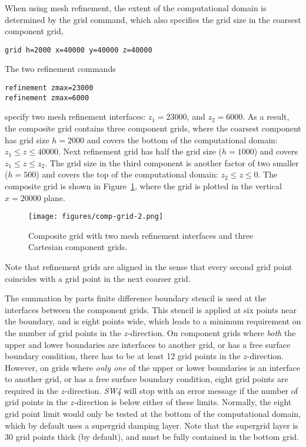 \documentclass[11pt]{report}
\begin{document}
When using mesh refinement, the extent of the computational domain is determined by the grid command,
which also specifies the grid size in the coarsest component grid,
\begin{verbatim}
grid h=2000 x=40000 y=40000 z=40000
\end{verbatim}
The two refinement commands
\begin{verbatim}
refinement zmax=23000
refinement zmax=6000
\end{verbatim}
specify two mesh refinement interfaces: $z_1=23000$, and $z_2=6000$. As a result, the composite grid
contains three component grids, where the coarsest component has grid size $h=2000$ and covers the
bottom of the computational domain: $z_1\leq z\leq 40000$. Next refinement grid has half the grid
size ($h=1000$) and covers $z_1\leq z\leq z_2$. The grid size in the third component is another
factor of two smaller ($h=500$) and covers the top of the computational domain: $z_2\leq z\leq
0$. The composite grid is shown in Figure~\ref{fig:gridrefs1}, where the grid is plotted in the
vertical $x=20000$ plane.
%
\begin{figure}
\begin{centering}
  \texttt{[image: figures/comp-grid-2.png]}
  \caption{Composite grid with two mesh refinement interfaces and three Cartesian component grids.}
  \label{fig:gridrefs1}
\end{centering}
\end{figure}  
Note that refinement grids are aligned in the sense that every second grid point coincides with a grid point in
the next coarser grid.

The summation by parts finite difference boundary stencil is used at the interfaces between the
component grids. This stencil is applied at six points near the boundary, and is eight points wide,
which leads to a minimum requirement on the number of grid points in the $z$-direction.  On
component grids where {\em both} the upper and lower boundaries are interfaces to another grid, or
has a free surface boundary condition, there has to be at least 12 grid points in the $z$-direction.
However, on grids where {\em only one} of the upper or lower boundaries is an interface to another
grid, or has a free surface boundary condition, eight grid points are required in the
$z$-direction. \emph{SW4} will stop with an error message if the number of grid points in the
$z$-direction is below either of these limits. Normally, the eight grid point limit would only be
tested at the bottom of the computational domain, which by default uses a supergrid damping
layer. Note that the supergrid layer is 30 grid points thick (by default), and must be fully
contained in the bottom grid.
\end{document}
